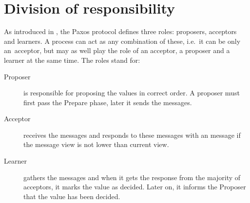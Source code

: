\section{Division of responsibility}

As introduced in \cite{Lam01}, the Paxos protocol defines three roles: proposers, acceptors and learners.
A process can act as any combination of these, i.e.\ it can be only an~acceptor, but may as well play the role of an acceptor, a proposer and a learner at the same time. The roles stand for:
\begin{description}
 \item[Proposer] is responsible for proposing the values in correct order. A proposer must first pass the Prepare phase, later it sends the \propose messages.
 
 \item[Acceptor] receives the \propose messages and responds to these messages with an \accept message if the message view is not lower than current view.
 
 \item[Learner] gathers the \accept messages and when it gets the response from the majority of acceptors, it marks the value as decided. Later on, it informs the Proposer that the value has been decided.
\end{description}


